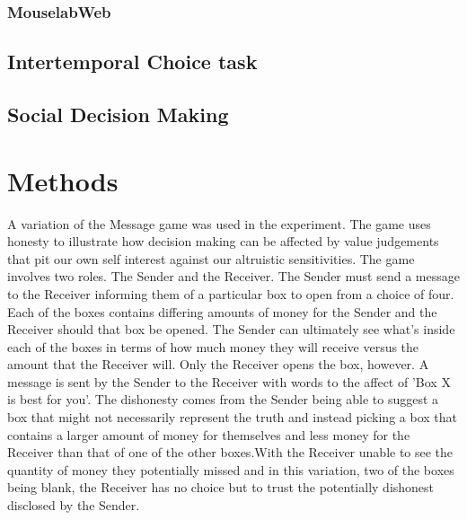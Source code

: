\documentclass[man, floatsintext]{apa7}
\begin{document}
\subsubsection{MouselabWeb}

\subsection{Intertemporal Choice task}

\subsection{Social Decision Making}


\section{Methods}


%
%
%

A variation of the Message game was used in the experiment. The game uses honesty to illustrate how decision making can be affected by value judgements that pit our own self interest against our altruistic sensitivities. The game involves two roles. The Sender and the Receiver. The Sender must send a message to the Receiver informing them of a particular box to open from a choice of four. Each of the boxes contains differing amounts of money for the Sender and the Receiver should that box be opened. The Sender can ultimately see what's inside each of the boxes in terms of how much money they will receive versus the amount that the Receiver will. Only the Receiver opens the box, however. A message is sent by the Sender to the Receiver with words to the affect of 'Box X is best for you'. The dishonesty comes from the Sender being able to suggest a box that might not necessarily represent the truth and instead picking a box that contains a larger amount of money for themselves and less money for the Receiver than that of one of the other boxes.With the Receiver unable to see the quantity of money they potentially missed and in this variation, two of the boxes being blank, the Receiver has no choice but to trust the potentially dishonest disclosed by the Sender.
\end{document}
